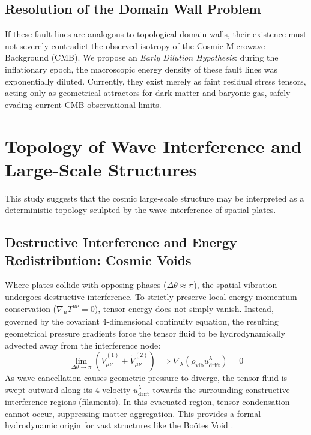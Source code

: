 \documentclass[reprint,amsmath,amssymb,aps,prd]{revtex4-2}
\begin{document}
\subsection{Resolution of the Domain Wall Problem}
If these fault lines are analogous to topological domain walls, their existence must not severely contradict the observed isotropy of the Cosmic Microwave Background (CMB). We propose an \textit{Early Dilution Hypothesis}: during the inflationary epoch, the macroscopic energy density of these fault lines was exponentially diluted. Currently, they exist merely as faint residual stress tensors, acting only as geometrical attractors for dark matter and baryonic gas, safely evading current CMB observational limits.

\section{Topology of Wave Interference and Large-Scale Structures}
This study suggests that the cosmic large-scale structure may be interpreted as a deterministic topology sculpted by the wave interference of spatial plates.

\subsection{Destructive Interference and Energy Redistribution: Cosmic Voids}
Where plates collide with opposing phases ($\Delta\theta \approx \pi$), the spatial vibration undergoes destructive interference. To strictly preserve local energy-momentum conservation ($\nabla_\mu T^{\mu\nu} = 0$), tensor energy does not simply vanish. Instead, governed by the covariant 4-dimensional continuity equation, the resulting geometrical pressure gradients force the tensor fluid to be hydrodynamically advected away from the interference node:
\begin{equation}
\lim_{\Delta\theta \to \pi} \left( \tilde{V}_{\mu\nu}^{(1)} + \tilde{V}_{\mu\nu}^{(2)} \right) \implies \nabla_\lambda (\rho_{\mathrm{vib}} u^\lambda_{\mathrm{drift}}) = 0
\end{equation}
As wave cancellation causes geometric pressure to diverge, the tensor fluid is swept outward along its 4-velocity $u^\lambda_{\mathrm{drift}}$ towards the surrounding constructive interference regions (filaments). In this evacuated region, tensor condensation cannot occur, suppressing matter aggregation. This provides a formal hydrodynamic origin for vast structures like the Bo\"{o}tes Void \cite{Kirshner1981}.
\end{document}
